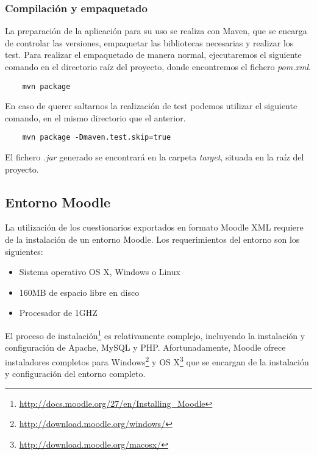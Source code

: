 \subsubsection{Compilación y empaquetado}
La preparación de la aplicación para su uso se realiza con Maven, que se encarga de controlar las versiones, empaquetar las bibliotecas necesarias y realizar los test.
Para realizar el empaquetado de manera normal, ejecutaremos el siguiente comando en el directorio raíz del proyecto, donde encontremos el fichero \emph{pom.xml}.
\begin{verbatim}
	mvn package
\end{verbatim}
En caso de querer saltarnos la realización de test podemos utilizar el siguiente comando, en el mismo directorio que el anterior.
\begin{verbatim}
	mvn package -Dmaven.test.skip=true
\end{verbatim}
El fichero \emph{.jar} generado se encontrará en la carpeta \emph{target}, situada en la raíz del proyecto.

\subsection{Entorno Moodle}
La utilización de los cuestionarios exportados en formato Moodle XML requiere de la instalación de un entorno Moodle.
Los requerimientos del entorno son los siguientes:
\begin{itemize}
	\item Sistema operativo OS X, Windows o Linux
	\item 160MB de espacio libre en disco
	\item Procesador de 1GHZ
\end{itemize}

El proceso de instalación\footnote{\url{http://docs.moodle.org/27/en/Installing\_Moodle}} es relativamente complejo, incluyendo la instalación y configuración de Apache, MySQL y PHP.
Afortunadamente, Moodle ofrece instaladores completos para Windows\footnote{\url{http://download.moodle.org/windows/}} y OS X\footnote{\url{http://download.moodle.org/macosx/}} que se encargan de la instalación y configuración del entorno completo.